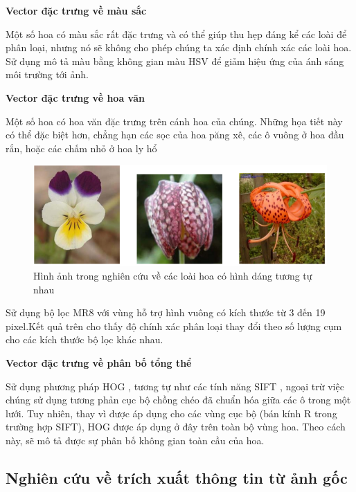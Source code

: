 \documentclass[12pt]{report}
\begin{document}
																																		
		\textbf{Vector đặc trưng về màu sắc}
																																
		Một số hoa có màu sắc rất đặc trưng và có thể giúp thu hẹp đáng kể các loài để phân loại, nhưng nó sẽ không cho phép chúng ta xác định chính xác các loài hoa. Sử dụng mô tả màu bằng không gian màu HSV \cite{cia-Nilsback06} để giảm hiệu ứng của ánh sáng môi trường tới ảnh.
																														
		\textbf{Vector đặc trưng về hoa văn}
		
		Một số hoa có hoa văn đặc trưng trên cánh hoa của chúng. Những họa tiết này có thể đặc biệt hơn, chẳng hạn các sọc của hoa păng xê, các ô vuông ở hoa đầu rắn, hoặc các chấm nhỏ ở hoa ly hổ
		\begin{figure}[h]
			\centering
			\includegraphics[scale=0.5]{anh_hoa_cau_truc}
			\caption{Hình ảnh trong nghiên cứu \cite{cia-Nilsback06} về các loài hoa có hình dáng tương tự nhau}
			\label{fig:anh_hoa_khacnhau_hoavan}
		\end{figure}
																												
		Sử dụng bộ lọc MR8 \cite{cia_MR8} với vùng hỗ trợ hình vuông có kích thước từ 3 đến 19 pixel.Kết quả trên cho thấy độ chính xác phân loại thay đổi theo số lượng cụm cho các kích thước bộ lọc khác nhau.
																												
		\textbf{Vector đặc trưng về phân bố tổng thể}
																												
		Sử dụng phương pháp HOG \cite{cia_HOG} , tương tự như các tính năng SIFT \cite{cia_SIFT}, ngoại trừ việc chúng sử dụng tương phản cục bộ chồng chéo đã chuẩn hóa giữa các ô trong một lưới. Tuy nhiên, thay vì được áp dụng cho các vùng cục bộ (bán kính R trong trường hợp SIFT\cite{cia_SIFT}), HOG được áp dụng ở đây trên toàn bộ vùng hoa. Theo cách này, sẽ mô tả được sự phân bố không gian toàn cầu của hoa.
																												
		\subsection{Nghiên cứu về trích xuất thông tin từ ảnh gốc}
																												
\end{document}

